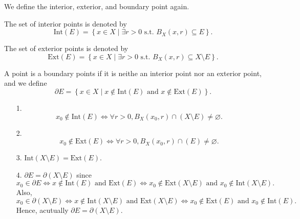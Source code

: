 \begin{definition*}
    We define the interior, exterior, and boundary point again. 
    \begin{definition}
        The set of interior points is denoted by
        \[
            \mathrm{Int} (E) = \left\{ x \in X \mid \exists r > 0 \text{ s.t. } B_X(x, r) \subseteq E \right\}.
        \] 
    \end{definition}
    \begin{definition}
       The set of exterior points is denoted by
        \[
            \mathrm{Ext} (E) = \left\{ x \in X \mid \exists r > 0 \text{ s.t. } B_X(x, r) \subseteq X \setminus E \right\}.
        \]  
    \end{definition}
    \begin{definition}
        A point is a boundary points if it is neithe an interior point nor an exterior point, and we define
        \[
            \partial E = \left\{ x \in X \mid x \notin \mathrm{Int}(E) \text{ and } x \notin \mathrm{Ext}(E) \right\}. 
        \]
    \end{definition}
\end{definition*}

\begin{remark}
    \vphantom{text}
    \begin{itemize}
        \item [1.]
        \[
            x_0 \notin \mathrm{Int} (E) \iff \forall r > 0, B_X(x_0, r) \cap (X \setminus E) \neq \varnothing.
        \]
        \item [2.]
        \[
           x_0 \notin \mathrm{Ext} (E) \iff \forall r > 0, B_X(x_0, r) \cap (E) \neq \varnothing.
        \]
        \item [3.] \(\mathrm{Int} (X \setminus E) = \mathrm{Ext} (E)\). 
        \item [4.] \(\partial E = \partial (X \setminus E) \) since 
        \[
            x_0 \in \partial E \iff x \notin \mathrm{Int}(E) \text{ and } \mathrm{Ext}(E) \iff x_0 \notin \mathrm{Ext}(X \setminus E) \text{ and } x_0 \notin \mathrm{Int}(X \setminus E).    
        \]  
        Also,
        \[
           x_0 \in \partial (X\setminus E) \iff x \notin \mathrm{Int}(X \setminus  E) \text{ and } \mathrm{Ext}(X \setminus E) \iff x_0 \notin \mathrm{Ext}(E) \text{ and } x_0 \notin \mathrm{Int}(E).  
        \]
        Hence, acutually \(\partial E = \partial (X \setminus E)\). 
    \end{itemize}
\end{remark}

